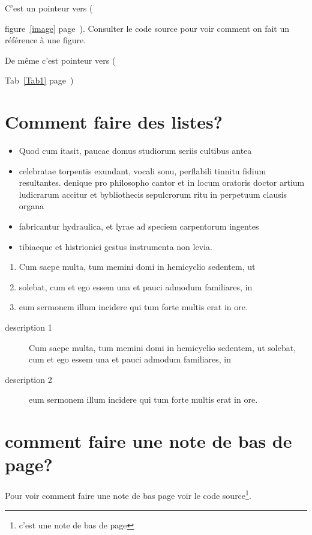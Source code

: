 \documentclass[a4paper,12pt]{report}
\begin{document}
C'est un pointeur vers ({figure~\ref{image} page~\pageref{image}).
Consulter le code source pour voir comment on fait un référence à une figure.

De même c'est pointeur vers ({Tab~\ref{Tab1} page~\pageref{Tab1})

\section{Comment faire des listes?}

\begin{itemize}
    \item Quod cum itasit, paucae domus studiorum seriis cultibus antea
    \item {celebratae  torpentis exundant, vocali sonu, perflabili tinnitu fidium resultantes. denique pro philosopho cantor et in locum oratoris
    doctor artium ludicrarum accitur et bybliothecis sepulcrorum ritu in perpetuum clausis organa}
    \item fabricantur hydraulica, et lyrae ad speciem carpentorum ingentes
    \item tibiaeque et histrionici gestus instrumenta non levia.
\end{itemize}

\begin{enumerate}
    \item Cum saepe multa, tum memini domi in hemicyclio sedentem, ut
    \item solebat, cum et ego essem una et pauci admodum familiares, in
    \item eum sermonem illum incidere qui tum forte multis erat in ore.
\end{enumerate}

\begin{description}
    \item[description 1] Cum saepe multa, tum memini domi in hemicyclio sedentem, ut solebat, cum et ego essem una et pauci admodum familiares, in
    \item[description 2] eum sermonem illum incidere qui tum forte multis erat in ore.
\end{description}


\section{comment faire une note de bas de page?}
Pour voir comment faire une note de bas page voir le code
source\footnote{c'est une note de bas de page}.

}}
\end{document}
